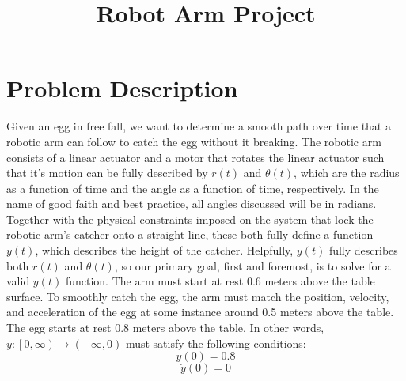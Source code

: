 \documentclass[nofoot,pdf-a,balance,colorlinks,upint,subscriptcorrection,varvw,mathalfa=cal=boondoxo]{asmeconf}
\begin{document}

    \title{Robot Arm Project}


\maketitle

    \section*{Problem Description}
	
    Given an egg in free fall, we want to determine a smooth path over time that a robotic arm can follow to catch the egg without it breaking. The robotic arm consists of a linear actuator and a motor that rotates the linear actuator such that it's motion can be fully described by $r\left(t\right)$ and $\theta\left(t\right)$, which are the radius as a function of time and the angle as a function of time, respectively. In the name of good faith and best practice, all angles discussed will be in radians. Together with the physical constraints imposed on the system that lock the robotic arm's catcher onto a straight line, these both fully define a function $y\left(t\right)$, which describes the height of the catcher. Helpfully, $y\left(t\right)$ fully describes both $r\left(t\right)$ and $\theta\left(t\right)$, so our primary goal, first and foremost, is to solve for a valid $y\left(t\right)$ function. The arm must start at rest 0.6 meters above the table surface. To smoothly catch the egg, the arm must match the position, velocity, and acceleration of the egg at some instance around 0.5 meters above the table. The egg starts at rest 0.8 meters above the table.\newline \newline 
    In other words, $y:\left[0, \infty\right) \to \left(-\infty, 0\right)
$ must satisfy the following conditions:
    \begin{equation}
        y\left(0\right) = 0.8
    \end{equation}
    \begin{equation}
        \dot{y}\left(0\right) = 0
    \end{equation}
\end{document}
